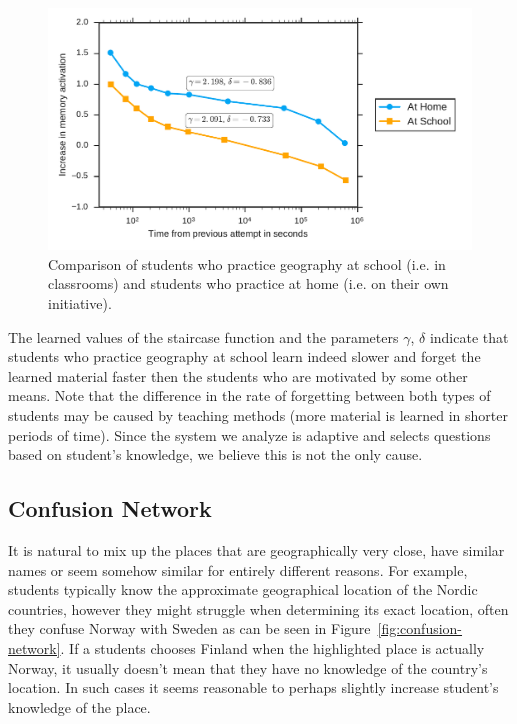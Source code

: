 \begin{figure}[htbp]
  \centering
  \includegraphics[width=\textwidth]{img/at-home-vs-at-school}
  \caption{Comparison of students who practice geography at school (i.e. in classrooms) and students who practice at home (i.e. on their own initiative).}
  \label{fig:at-home-vs-at-school}
\end{figure}

The learned values of the staircase function and the parameters $\gamma$, $\delta$ indicate that students who practice geography at school learn indeed slower and forget the learned material faster then the students who are motivated by some other means. Note that the difference in the rate of forgetting between both types of students may be caused by teaching methods (more material is learned in shorter periods of time). Since the system we analyze is adaptive and selects questions based on student's knowledge, we believe this is not the only cause.

\subsection{Confusion Network}

It is natural to mix up the places that are geographically very close, have similar names or seem somehow similar for entirely different reasons. For example, students typically know the approximate geographical location of the Nordic countries, however they might struggle when determining its exact location, often they confuse Norway with Sweden as can be seen in Figure~\ref{fig:confusion-network}. If a students chooses Finland when the highlighted place is actually Norway, it usually doesn't mean that they have no knowledge of the country's location. In such cases it seems reasonable to perhaps slightly increase student's knowledge of the place.


